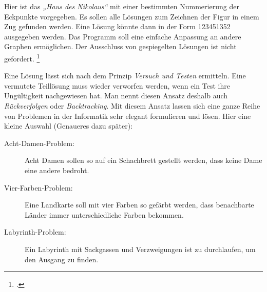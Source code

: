 \documentclass{bschlangaul-aufgabe}
\begin{document}

\noindent
Hier ist das \emph{„Haus des Nikolaus“} mit einer bestimmten
Nummerierung der Eckpunkte vorgegeben. Es sollen alle Lösungen zum
Zeichnen der Figur in einem Zug gefunden werden. Eine Lösung könnte dann
in der Form 123451352 ausgegeben werden. Das Programm soll eine einfache
Anpassung an andere Graphen ermöglichen. Der Ausschluss von gespiegelten
Lösungen ist nicht gefordert.
\footcite[Diese Aufgabe stammt von der Website oberstufeninformatik.de. Die
Materialien sind nicht Freeware, sondern Beerware. Voraussetzung für
den Einsatz ist, dass der Benutzer ein Bier zum Wohle des Autors Horst
Gierhardt trinkt, Seite 2-3, Aufgabe 3]{aud:ab:3}

\begin{center}
\end{center}

\begin{bExkurs}[Backtracking]
Eine Lösung lässt sich nach dem Prinzip \emph{Versuch und Testen}
ermitteln. Eine vermutete Teillösung muss wieder verworfen werden, wenn
ein Test ihre Ungültigkeit nachgewiesen hat. Man nennt diesen Ansatz
deshalb auch \emph{Rückverfolgen} oder \emph{Backtracking}. Mit diesem
Ansatz lassen sich eine ganze Reihe von Problemen in der Informatik sehr
elegant formulieren und lösen. Hier eine kleine Auswahl (Genaueres dazu
später):

\begin{description}
\item[Acht-Damen-Problem:] Acht Damen sollen so auf ein Schachbrett
gestellt werden, dass keine Dame eine andere bedroht.

\item[Vier-Farben-Problem:] Eine Landkarte soll mit vier Farben so
gefärbt werden, dass benachbarte Länder immer unterschiedliche Farben
bekommen.

\item[Labyrinth-Problem:] Ein Labyrinth mit Sackgassen und Verzweigungen
ist zu durchlaufen, um den Ausgang zu finden.
\end{description}
\end{bExkurs}
\end{document}
